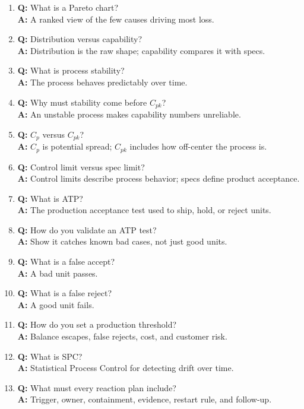 \begin{enumerate}
\textbf{A:} It can hide heavy rework and unstable process behavior.
\item \textbf{Q:} What is a Pareto chart?\\
\textbf{A:} A ranked view of the few causes driving most loss.
\item \textbf{Q:} Distribution versus capability?\\
\textbf{A:} Distribution is the raw shape; capability compares it with specs.
\item \textbf{Q:} What is process stability?\\
\textbf{A:} The process behaves predictably over time.
\item \textbf{Q:} Why must stability come before $C_{pk}$?\\
\textbf{A:} An unstable process makes capability numbers unreliable.
\item \textbf{Q:} $C_p$ versus $C_{pk}$?\\
\textbf{A:} $C_p$ is potential spread; $C_{pk}$ includes how off-center the
process is.
\item \textbf{Q:} Control limit versus spec limit?\\
\textbf{A:} Control limits describe process behavior; specs define product
acceptance.
\item \textbf{Q:} What is ATP?\\
\textbf{A:} The production acceptance test used to ship, hold, or reject units.
\item \textbf{Q:} How do you validate an ATP test?\\
\textbf{A:} Show it catches known bad cases, not just good units.
\item \textbf{Q:} What is a false accept?\\
\textbf{A:} A bad unit passes.
\item \textbf{Q:} What is a false reject?\\
\textbf{A:} A good unit fails.
\item \textbf{Q:} How do you set a production threshold?\\
\textbf{A:} Balance escapes, false rejects, cost, and customer risk.
\item \textbf{Q:} What is SPC?\\
\textbf{A:} Statistical Process Control for detecting drift over time.
\item \textbf{Q:} What must every reaction plan include?\\
\textbf{A:} Trigger, owner, containment, evidence, restart rule, and follow-up.

\end{enumerate}
